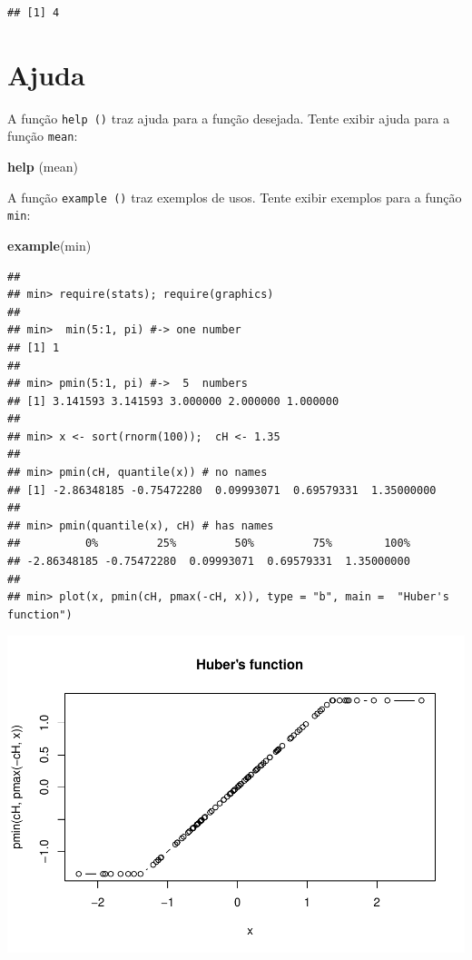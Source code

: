 \documentclass[
]{book}
\newenvironment{Shaded}{\begin{snugshade}}{\end{snugshade}}
\newcommand{\KeywordTok}[1]{\textcolor[rgb]{0.13,0.29,0.53}{\textbf{#1}}}
\newcommand{\NormalTok}[1]{#1}
\begin{document}
\begin{verbatim}
## [1] 4
\end{verbatim}

\hypertarget{ajuda}{%
\section{Ajuda}\label{ajuda}}

A função \texttt{help\ ()} traz ajuda para a função desejada. Tente exibir ajuda para a função \texttt{mean}:

\begin{Shaded}
\begin{Highlighting}[]
\KeywordTok{help}\NormalTok{ (mean)}
\end{Highlighting}
\end{Shaded}

A função \texttt{example\ ()} traz exemplos de usos. Tente exibir exemplos para a função \texttt{min}:

\begin{Shaded}
\begin{Highlighting}[]
\KeywordTok{example}\NormalTok{(min)}
\end{Highlighting}
\end{Shaded}

\begin{verbatim}
## 
## min> require(stats); require(graphics)
## 
## min>  min(5:1, pi) #-> one number
## [1] 1
## 
## min> pmin(5:1, pi) #->  5  numbers
## [1] 3.141593 3.141593 3.000000 2.000000 1.000000
## 
## min> x <- sort(rnorm(100));  cH <- 1.35
## 
## min> pmin(cH, quantile(x)) # no names
## [1] -2.86348185 -0.75472280  0.09993071  0.69579331  1.35000000
## 
## min> pmin(quantile(x), cH) # has names
##          0%         25%         50%         75%        100% 
## -2.86348185 -0.75472280  0.09993071  0.69579331  1.35000000 
## 
## min> plot(x, pmin(cH, pmax(-cH, x)), type = "b", main =  "Huber's function")
\end{verbatim}

\includegraphics{TudodoR_files/figure-latex/unnamed-chunk-14-1.pdf}
\end{document}
